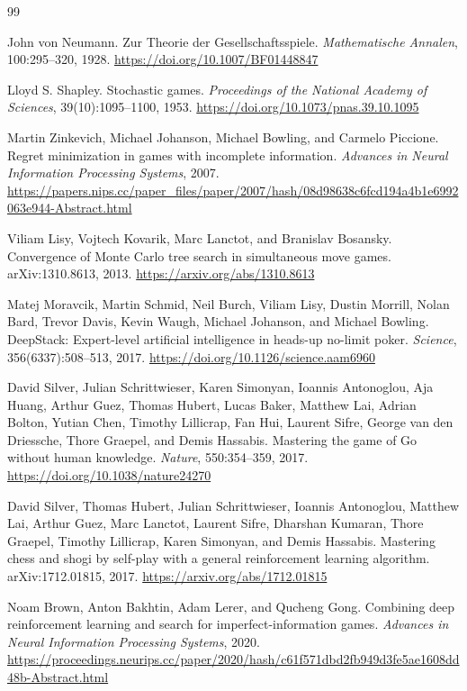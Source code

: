 \documentclass[11pt]{article}
\begin{document}
\begin{thebibliography}{99}

John von Neumann.
\newblock Zur Theorie der Gesellschaftsspiele.
\newblock \emph{Mathematische Annalen}, 100:295--320, 1928.
\newblock \url{https://doi.org/10.1007/BF01448847}

Lloyd S. Shapley.
\newblock Stochastic games.
\newblock \emph{Proceedings of the National Academy of Sciences},
39(10):1095--1100, 1953.
\newblock \url{https://doi.org/10.1073/pnas.39.10.1095}

Martin Zinkevich, Michael Johanson, Michael Bowling, and Carmelo Piccione.
\newblock Regret minimization in games with incomplete information.
\newblock \emph{Advances in Neural Information Processing Systems}, 2007.
\newblock \url{https://papers.nips.cc/paper_files/paper/2007/hash/08d98638c6fcd194a4b1e6992063e944-Abstract.html}

Viliam Lisy, Vojtech Kovarik, Marc Lanctot, and Branislav Bosansky.
\newblock Convergence of Monte Carlo tree search in simultaneous move games.
\newblock arXiv:1310.8613, 2013.
\newblock \url{https://arxiv.org/abs/1310.8613}

Matej Moravcik, Martin Schmid, Neil Burch, Viliam Lisy, Dustin Morrill,
Nolan Bard, Trevor Davis, Kevin Waugh, Michael Johanson, and Michael Bowling.
\newblock DeepStack: Expert-level artificial intelligence in heads-up
no-limit poker.
\newblock \emph{Science}, 356(6337):508--513, 2017.
\newblock \url{https://doi.org/10.1126/science.aam6960}

David Silver, Julian Schrittwieser, Karen Simonyan, Ioannis Antonoglou,
Aja Huang, Arthur Guez, Thomas Hubert, Lucas Baker, Matthew Lai, Adrian Bolton,
Yutian Chen, Timothy Lillicrap, Fan Hui, Laurent Sifre,
George van den Driessche, Thore Graepel, and Demis Hassabis.
\newblock Mastering the game of Go without human knowledge.
\newblock \emph{Nature}, 550:354--359, 2017.
\newblock \url{https://doi.org/10.1038/nature24270}

David Silver, Thomas Hubert, Julian Schrittwieser, Ioannis Antonoglou,
Matthew Lai, Arthur Guez, Marc Lanctot, Laurent Sifre, Dharshan Kumaran,
Thore Graepel, Timothy Lillicrap, Karen Simonyan, and Demis Hassabis.
\newblock Mastering chess and shogi by self-play with a general reinforcement
learning algorithm.
\newblock arXiv:1712.01815, 2017.
\newblock \url{https://arxiv.org/abs/1712.01815}

Noam Brown, Anton Bakhtin, Adam Lerer, and Qucheng Gong.
\newblock Combining deep reinforcement learning and search for
imperfect-information games.
\newblock \emph{Advances in Neural Information Processing Systems}, 2020.
\newblock \url{https://proceedings.neurips.cc/paper/2020/hash/c61f571dbd2fb949d3fe5ae1608dd48b-Abstract.html}

\end{thebibliography}
\end{document}
